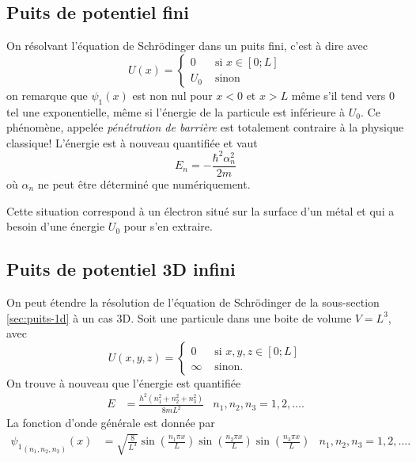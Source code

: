 \subsection{Puits de potentiel fini}
On résolvant l'équation de Schrödinger dans un puits
fini, c'est à dire avec
\[ U(x) = \left\{
  \begin{aligned}
    0 & \text{ si } x \in [0; L]\\
    U_0 & \text{ sinon}
  \end{aligned}
\right. \]
on remarque que $\psi_1(x)$ est non nul pour $x < 0$ et $x > L$
même s'il tend vers 0 tel une exponentielle, même si l'énergie de
la particule est inférieure à $U_0$. Ce phénomène,
appelée \emph{pénétration de barrière} est totalement
contraire à la physique classique!
L'énergie est à nouveau quantifiée et vaut
\[
  E_n = -\frac{\hbar^2\alpha_n^2}{2m}
\]
où $\alpha_n$ ne peut être déterminé que numériquement.

\begin{myrem}
	Cette situation correspond à un électron
	situé sur la surface d'un métal et qui a besoin
	d'une énergie $U_0$ pour s'en extraire.
\end{myrem}

\subsection{Puits de potentiel 3D infini}
On peut étendre la résolution de l'équation de Schrödinger
de la sous-section \ref{sec:puits-1d} à un cas 3D.
Soit une particule dans une boite de volume $V = L^3$,
avec 
\[ U(x,y,z) = \left\{
  \begin{aligned}
    0 & \text{ si } x,y,z \in [0; L]\\
    \infty & \text{ sinon}.
  \end{aligned}
\right. \]
On trouve à nouveau que l'énergie est quantifiée
\begin{align*}
  E & = \frac{h^2(n_1^2+n_2^2+n_3^2)}{8mL^2} & n_1,n_2,n_3 = 1, 2, \ldots.
\end{align*}
La fonction d'onde générale est donnée par
\begin{align*}
  {\psi_1}_{(n_1,n_2,n_3)}(x) & =
  \sqrt{\frac{8}{L^3}}\sin\left(\frac{n_1\pi x}{L}\right)
											\sin\left(\frac{n_2\pi x}{L}\right)
											\sin\left(\frac{n_3\pi x}{L}\right)& n_1,n_2,n_3 = 1, 2, \ldots.
\end{align*}

